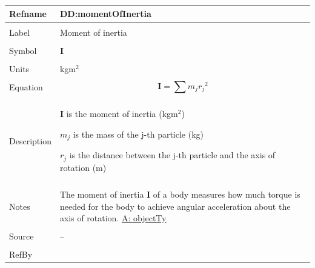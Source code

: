 \documentclass[12pt]{article}
\begin{document}
\noindent \begin{minipage}{\textwidth}
          \begin{tabular}{>{\raggedright}p{}>{\raggedright\arraybackslash}p{}}
          \toprule \textbf{Refname} & \textbf{DD:momentOfInertia}
          \label{DD:momentOfInertia}
          \\ \midrule \\
          Label & Moment of inertia
          \\ \midrule \\
          Symbol & $\mathbf{I}$
          \\ \midrule \\
          Units & kg$\text{m}^{2}$
          \\ \midrule \\
          Equation & \begin{displaymath}
                     \mathbf{I}=\displaystyle\sum{{m_{j}} {r_{j}}^{2}}
                     \end{displaymath}
          \\ \midrule \\
          Description & \begin{symbDescription}
                        \item{$\mathbf{I}$ is the moment of inertia (kg$\text{m}^{2}$)}
                        \item{${m_{j}}$ is the mass of the j-th particle (kg)}
                        \item{${r_{j}}$ is the distance between the j-th particle and the axis of rotation (m)}
                        \end{symbDescription}
          \\ \midrule \\
          Notes & The moment of inertia $\mathbf{I}$ of a body measures how much torque is needed for the body to achieve angular acceleration about the axis of rotation.
                  \hyperref[assumpOT]{A: objectTy}
          \\ \midrule \\
          Source & --
          \\ \midrule \\
          RefBy & 
          \\ \bottomrule
          \end{tabular}
          \end{minipage}
\end{document}
